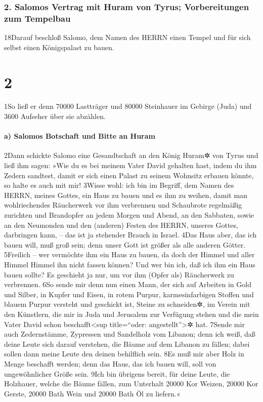 \hypertarget{salomos-vertrag-mit-huram-von-tyrus-vorbereitungen-zum-tempelbau}{%
\subsubsection{2. Salomos Vertrag mit Huram von Tyrus; Vorbereitungen
zum
Tempelbau}\label{salomos-vertrag-mit-huram-von-tyrus-vorbereitungen-zum-tempelbau}}

18Darauf beschloß Salomo, dem Namen des HERRN einen Tempel und für sich
selbst einen Königspalast zu bauen.

\hypertarget{section-1}{%
\section{2}\label{section-1}}

1So ließ er denn 70000 Lastträger und 80000 Steinhauer im Gebirge (Juda)
und 3600 Aufseher über sie abzählen.

\hypertarget{a-salomos-botschaft-und-bitte-an-huram}{%
\paragraph{a) Salomos Botschaft und Bitte an
Huram}\label{a-salomos-botschaft-und-bitte-an-huram}}

2Dann schickte Salomo eine Gesandtschaft an den König Huram✲ von Tyrus
und ließ ihm sagen: »Wie du es bei meinem Vater David gehalten hast,
indem du ihm Zedern sandtest, damit er sich einen Palast zu seinem
Wohnsitz erbauen könnte, so halte es auch mit mir! 3Wisse wohl: ich bin
im Begriff, dem Namen des HERRN, meines Gottes, ein Haus zu bauen und es
ihm zu weihen, damit man wohlriechendes Räucherwerk vor ihm verbrennen
und Schaubrote regelmäßig zurichten und Brandopfer an jedem Morgen und
Abend, an den Sabbaten, sowie an den Neumonden und den (anderen) Festen
des HERRN, unseres Gottes, darbringen kann, -- das ist ja stehender
Brauch in Israel. 4Das Haus aber, das ich bauen will, muß groß sein;
denn unser Gott ist größer als alle anderen Götter. 5Freilich -- wer
vermöchte ihm ein Haus zu bauen, da doch der Himmel und aller Himmel
Himmel ihn nicht fassen können? Und wer bin ich, daß ich ihm ein Haus
bauen sollte? Es geschieht ja nur, um vor ihm (Opfer als) Räucherwerk zu
verbrennen. 6So sende mir denn nun einen Mann, der sich auf Arbeiten in
Gold und Silber, in Kupfer und Eisen, in rotem Purpur, karmesinfarbigen
Stoffen und blauem Purpur versteht und geschickt ist, Steine zu
schneiden✲, im Verein mit den Künstlern, die mir in Juda und Jerusalem
zur Verfügung stehen und die mein Vater David schon
beschafft\textless sup title=``oder: angestellt''\textgreater✲ hat.
7Sende mir auch Zedernstämme, Zypressen und Sandelholz vom Libanon; denn
ich weiß, daß deine Leute sich darauf verstehen, die Bäume auf dem
Libanon zu fällen; dabei sollen dann meine Leute den deinen behilflich
sein. 8Es muß mir aber Holz in Menge beschafft werden; denn das Haus,
das ich bauen will, soll von ungewöhnlicher Größe sein. 9Ich bin
übrigens bereit, für deine Leute, die Holzhauer, welche die Bäume
fällen, zum Unterhalt 20000 Kor Weizen, 20000 Kor Gerste, 20000 Bath
Wein und 20000 Bath Öl zu liefern.«


